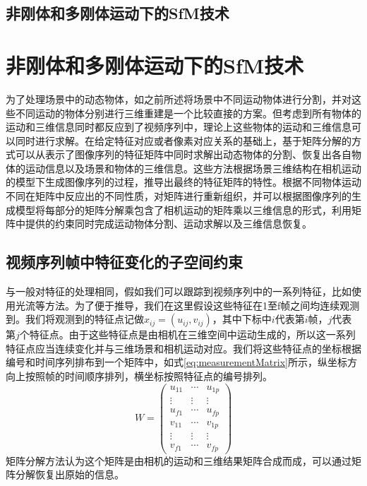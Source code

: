 \subsection{非刚体和多刚体运动下的SfM技术}
\label{subsec:non-rigid_SfM}
\section{非刚体和多刚体运动下的SfM技术}
\label{subsec:non-rigid_SfM}
为了处理场景中的动态物体，如之前所述将场景中不同运动物体进行分割，并对这些不同运动的物体分别进行三维重建是一个比较直接的方案。但考虑到所有物体的运动和三维信息同时都反应到了视频序列中，理论上这些物体的运动和三维信息可以同时进行求解。在给定特征对应或者像素对应关系的基础上，基于矩阵分解的方式可以从表示了图像序列的特征矩阵中同时求解出动态物体的分割、恢复出各自物体的运动信息以及场景和物体的三维信息。这些方法根据场景三维结构在相机运动的模型下生成图像序列的过程，推导出最终的特征矩阵的特性。根据不同物体运动不同在矩阵中反应出的不同性质，对矩阵进行重新组织，并可以根据图像序列的生成模型将每部分的矩阵分解乘包含了相机运动的矩阵乘以三维信息的形式，利用矩阵中提供的约束同时完成运动物体分割、运动求解以及三维信息恢复。

\subsection{视频序列帧中特征变化的子空间约束}\label{subsec:subspace}
与一般对特征的处理相同，假如我们可以跟踪到视频序列中的一系列特征，比如使用光流等方法。为了便于推导，我们在这里假设这些特征在1至f帧之间均连续观测到。我们将观测到的特征点记做$x_{ij}=(u_{ij},v_{ij})$，其中下标中$i$代表第$i$帧，$j$代表第$j$个特征点。由于这些特征点是由相机在三维空间中运动生成的，所以这一系列特征点应当连续变化并与三维场景和相机运动对应。我们将这些特征点的坐标根据编号和时间序列排布到一个矩阵中，如式\eqref{eq:measurementMatrix}所示，纵坐标方向上按照帧的时间顺序排列，横坐标按照特征点的编号排列。
\begin{equation}\label{eq:measurementMatrix}
W=
\begin{pmatrix}
u_{11}& \cdots & u_{1p}\\
\vdots& \vdots &\vdots\\
u_{f1}& \cdots & u_{fp}\\
v_{11}& \cdots & v_{1p}\\
\vdots& \vdots &\vdots\\
v_{f1}& \cdots & v_{fp}
\end{pmatrix}
\end{equation}
矩阵分解方法认为这个矩阵是由相机的运动和三维结果矩阵合成而成，可以通过矩阵分解恢复出原始的信息。

